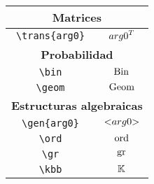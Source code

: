 \begin{longtable}{|c|c|}
\multicolumn{2}{|c|}{\textbf{Matrices}} \\ \hline 
\verb|\trans{arg0}| & $\displaystyle{arg0}^{T}$ \\ \hline 
\multicolumn{2}{|c|}{\textbf{Probabilidad}} \\ \hline 
\verb|\bin| & $\displaystyle\operatorname{Bin}$ \\ \hline 
\verb|\geom| & $\displaystyle\operatorname{Geom}$ \\ \hline 
\multicolumn{2}{|c|}{\textbf{Estructuras algebraicas}} \\ \hline 
\verb|\gen{arg0}| & $\displaystyle\mathopen{<} arg0 \mathclose{>}$ \\ \hline 
\verb|\ord| & $\displaystyle\operatorname{ord}$ \\ \hline 
\verb|\gr| & $\displaystyle\operatorname{gr}$ \\ \hline 
\verb|\kbb| & $\displaystyle\mathbb{K}$ \\ \hline 
\end{longtable}